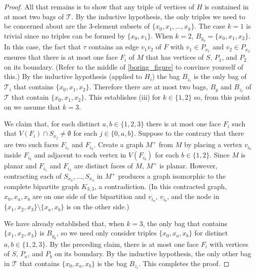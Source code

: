 \documentclass{patmorin}
\theoremstyle{plain}
\theoremstyle{definition}
\newcommand{\note}[2]{\noindent{\color{red}[#1:~#2]}}
\begin{document}
\begin{proof}
	All that remains is to show that any triple of vertices of $H$ is contained in at most two bags of $\mathcal{T}$. By the inductive hypothesis, the only triples we need to be concerned about are the $3$-element subsets of  $\{x_0,x_1,\ldots,x_k\}$. The case $k=1$ is trivial since no triples can be formed by $\{x_0,x_1\}$.  When $k=2$, $B_{y_0}=\{x_0,x_1,x_2\}$.  In this case, the fact that $\tau$ contains an edge $v_1v_2$ of $F$ with $v_1\in P_{x_1}$ and $v_2\in P_{x_2}$ ensures that there is at most one face $F_i$ of $M$ that has vertices of $S$, $P_1$, and $P_2$ on its boundary.  (Refer to the middle of \cref{boring_figure} to convince yourself of this.)  By the inductive hypothesis (applied to $H_i$) the bag $B_{z_i}$ is the only bag of $\mathcal{T}_i$ that contains $\{x_0,x_1,x_2\}$.  Therefore there are at most two bags, $B_y$ and $B_{z_i}$ of $\mathcal{T}$ that contain $\{x_0,x_1,x_2\}$.  This establishes (iii) for $k\in\{1,2\}$ so, from this point on we assume that $k=3$.

	We claim that, for each distinct $a,b\in \{1,2,3\}$ there is at most one face $F_i$ such that $V(F_i)\cap S_{x_j}\neq\emptyset$ for each $j\in\{0,a,b\}$.  Suppose to the contrary that there are two such faces $F_{i_1}$ and $F_{i_2}$.  Create a graph $M^+$ from $M$ by placing a vertex $v_{i_b}$ inside $F_{i_b}$ and adjacent to each vertex in $V(F_{i_b})$ for each $b\in\{1,2\}$.  Since $M$ is planar and $F_{i_1}$ and $F_{i_2}$ are distinct faces of $M$, $M^+$ is planar.  However, contracting each of $S_{x_0},\ldots,S_{x_3}$ in $M^+$ produces a graph isomorphic to the complete bipartite graph $K_{3,3}$, a contradiction.  (In this contracted graph, $x_0,x_a,x_b$ are on one side of the bipartition and $v_{i_a}$, $v_{i_b}$, and the node in $\{x_1,x_2,x_3\}\setminus\{x_a,x_b\}$ is on the other side.)

	We have already established that, when $k=3$, the only bag that contains $\{x_1,x_2,x_3\}$ is $B_{y_0}$, so we need only consider triples $\{x_0,x_a,x_b\}$ for distinct $a,b\in\{1,2,3\}$. By the preceding claim, there is at most one face $F_i$ with vertices of $S$, $P_a$, and $P_b$ on its boundary.  By the inductive hypothesis, the only other bag in $\mathcal{T}$ that contains $\{x_0,x_a,x_b\}$ is the bag $B_{z_i}$.  This completes the proof.
\end{proof}

%
%
\end{document}
